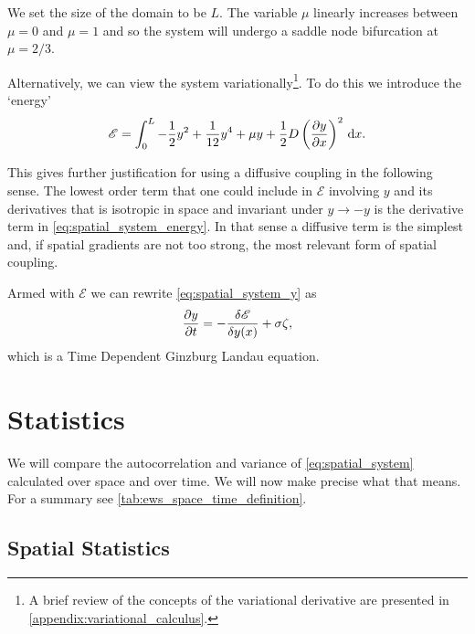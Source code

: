 We set the size of the domain to be $L$. The variable $\mu$ linearly increases between $\mu = 0$ and $\mu = 1$ and so the system will undergo a saddle node
bifurcation at $\mu = 2/3$.

Alternatively, we can view the system variationally\footnote{A brief review of the concepts of the variational derivative are presented in \cref{appendix:variational_calculus}.}.
To do this we introduce the `energy'
\begin{equation}
  \label{eq:spatial_system_energy}
  \mathscr{E} = \int_0^L -\frac{1}{2}y^2 + \frac{1}{12}y^4 + \mu y + \frac{1}{2}D\left(\pdv{y}{x}\right)^2\,\mathrm{d}{x}.
\end{equation}

This gives further justification for using a diffusive coupling in the following sense. The lowest order term that one could include in $\mathscr{E}$ involving
$y$ and its derivatives that is isotropic in space and invariant under $y \rightarrow -y$ is the derivative term in \cref{eq:spatial_system_energy}. In that sense a diffusive term is the simplest
and, if spatial gradients are not too strong, the most relevant form of spatial coupling.

Armed with $\mathscr{E}$ we can rewrite \cref{eq:spatial_system_y} as
\begin{equation}
  \label{eq:spatial_system_y_variational}
    \pdv{y}{t} = -\fdv{\mathscr{E}}{y(x)}  + \sigma\zeta, 
\end{equation}
which is a Time Dependent Ginzburg Landau equation\cite{goldenfeld1992}.

\section{Statistics}
We will compare the autocorrelation and variance of \cref{eq:spatial_system} calculated over space and over time. We will now
make precise what that means. For a summary see \cref{tab:ews_space_time_definition}.

\subsection{Spatial Statistics}

